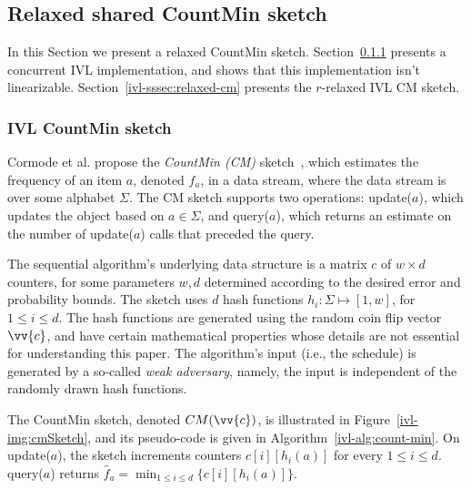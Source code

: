 \subsection{Relaxed shared CountMin sketch}
\label{ivl-ssec:countMin}

In this Section we present a relaxed CountMin sketch. Section~\ref{ivl-sssec:cm} presents a concurrent
IVL implementation, and shows that this implementation isn't linearizable.
Section~\ref{ivl-sssec:relaxed-cm} presents the $r$-relaxed IVL CM sketch.

\subsubsection{IVL CountMin sketch}
\label{ivl-sssec:cm}

Cormode et al. propose the \emph{CountMin (CM)} sketch~\cite{CountMin}, which
estimates the frequency of an item $a$, denoted $f_a$, in a data stream, where the data stream
is over some alphabet $\Sigma$. The CM sketch supports two operations: {\sc update}($a$),
which updates the object based on $a \in \Sigma$, and {\sc query}($a$), which returns
an estimate on the number of {\sc update}($a$) calls that preceded the query. 

The sequential algorithm's underlying data structure is a matrix $c$ of $w \times d$ counters,
for some parameters $w,d$ determined according to the desired error and probability bounds.
The sketch uses $d$ hash functions $h_i: \Sigma \mapsto [1,w]$, for $1 \leq i \leq d$.
The hash functions are generated using the random coin flip vector $\vv{c}$,
and have certain mathematical properties whose details are not essential for understanding this paper.
The algorithm's input (i.e., the schedule) is generated by a so-called \emph{weak adversary}, namely,
the input is independent of the randomly drawn hash functions.

The CountMin sketch, denoted $CM(\vv{c})$, is illustrated in Figure~\ref{ivl-img:cmSketch}, and its
pseudo-code is given in Algorithm~\ref{ivl-alg:count-min}.
On {\sc update}($a$), the sketch increments counters $c[i][h_i(a)]$ for every
$1 \leq i \leq d$. {\sc query}($a$) returns $\hat{f}_a=\min_{1 \leq i \leq d}\{c[i][h_i(a)]\}$.

